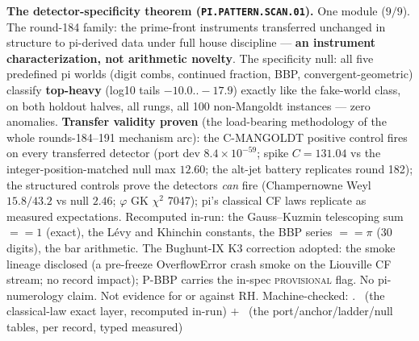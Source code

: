 \documentclass[11pt,a4paper]{article}
\theoremstyle{definition}
\begin{document}
\par\smallskip\noindent\textbf{The detector-specificity theorem
(\texttt{PI.\allowbreak PATTERN.\allowbreak SCAN.01}).}
One module ($9/9$).  The round-184 family: the prime-front
instruments transferred unchanged in structure to pi-derived data
under full house discipline --- \textbf{an instrument
characterization, not arithmetic novelty}.  The specificity null:
all five predefined pi worlds (digit combs, continued fraction,
BBP, convergent-geometric) classify \textbf{top-heavy} (log10
tails $-10.0..-17.9$) exactly like the fake-world class, on both
holdout halves, all rungs, all 100 non-Mangoldt instances ---
zero anomalies.  \textbf{Transfer validity proven} (the
load-bearing methodology of the whole rounds-184--191 mechanism
arc): the C-MANGOLDT positive control fires on every transferred
detector (port dev $8.4\times10^{-59}$; spike $C = 131.04$ vs the
integer-position-matched null max $12.60$; the alt-jet battery
replicates round 182); the structured controls prove the
detectors \emph{can} fire (Champernowne Weyl $15.8/43.2$ vs null
$2.46$; $\varphi$ GK $\chi^2$ 7047); pi's classical CF laws
replicate as measured expectations.  Recomputed in-run: the
Gauss--Kuzmin telescoping sum $== 1$ (exact), the L\'evy and
Khinchin constants, the BBP series $== \pi$ (30 digits), the bar
arithmetic.  The Bughunt-IX K3 correction adopted: the smoke
lineage disclosed (a pre-freeze OverflowError crash smoke on the
Liouville CF stream; no record impact); P-BBP carries the in-spec
\textsc{provisional} flag.  No pi-numerology claim.  Not evidence
for or against RH.
Machine-checked: .
\mE\ (the classical-law exact layer, recomputed in-run) $+$ \mC\
(the port/anchor/ladder/null tables, per record, typed measured)
\par\smallskip
\end{document}

